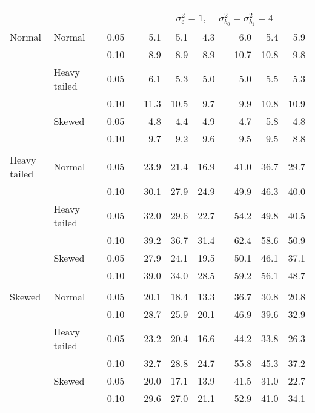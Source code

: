 \begin{table}[ht]
\begin{scriptsize}
\begin{tabular}{ll p{.1cm} c p{.1cm} rrr p{.1cm} rrr}
&&&&&&&&&&&\\
& && && \multicolumn{7}{c}{$\sigma_{\varepsilon}^2 = 1$, \ \ $\sigma_{b_0}^2 = \sigma_{b_1}^2 = 4$} \\ \cline{6-12}
\rowcolor{gray!20} Normal & Normal &  & 0.05 &  & 5.1 & 5.1 & 4.3 &  & 6.0 & 5.4 & 5.9 \\ 
\rowcolor{gray!20}    &  &  & 0.10 &  & 8.9 & 8.9 & 8.9 &  & 10.7 & 10.8 & 9.8 \\ 
\rowcolor{gray!20}    & Heavy tailed &  & 0.05 &  & 6.1 & 5.3 & 5.0 &  & 5.0 & 5.5 & 5.3 \\ 
\rowcolor{gray!20}    &  &  & 0.10 &  & 11.3 & 10.5 & 9.7 &  & 9.9 & 10.8 & 10.9 \\ 
\rowcolor{gray!20}    & Skewed &  & 0.05 &  & 4.8 & 4.4 & 4.9 &  & 4.7 & 5.8 & 4.8 \\ 
\rowcolor{gray!20}    &  &  & 0.10 &  & 9.7 & 9.2 & 9.6 &  & 9.5 & 9.5 & 8.8 \\ 
&&&&&&&&&&&\\
  Heavy tailed & Normal &  & 0.05 &  & 23.9 & 21.4 & 16.9 &  & 41.0 & 36.7 & 29.7 \\ 
   &  &  & 0.10 &  & 30.1 & 27.9 & 24.9 &  & 49.9 & 46.3 & 40.0 \\ 
   & Heavy tailed &  & 0.05 &  & 32.0 & 29.6 & 22.7 &  & 54.2 & 49.8 & 40.5 \\ 
   &  &  & 0.10 &  & 39.2 & 36.7 & 31.4 &  & 62.4 & 58.6 & 50.9 \\ 
   & Skewed &  & 0.05 &  & 27.9 & 24.1 & 19.5 &  & 50.1 & 46.1 & 37.1 \\ 
   &  &  & 0.10 &  & 39.0 & 34.0 & 28.5 &  & 59.2 & 56.1 & 48.7 \\ 
&&&&&&&&&&&\\
  Skewed & Normal &  & 0.05 &  & 20.1 & 18.4 & 13.3 &  & 36.7 & 30.8 & 20.8 \\ 
   &  &  & 0.10 &  & 28.7 & 25.9 & 20.1 &  & 46.9 & 39.6 & 32.9 \\ 
   & Heavy tailed &  & 0.05 &  & 23.2 & 20.4 & 16.6 &  & 44.2 & 33.8 & 26.3 \\ 
   &  &  & 0.10 &  & 32.7 & 28.8 & 24.7 &  & 55.8 & 45.3 & 37.2 \\ 
   & Skewed &  & 0.05 &  & 20.0 & 17.1 & 13.9 &  & 41.5 & 31.0 & 22.7 \\ 
   &  &  & 0.10 &  & 29.6 & 27.0 & 21.1 &  & 52.9 & 41.0 & 34.1 \\ 

\hline
\end{tabular}
\end{scriptsize}
\end{table}


